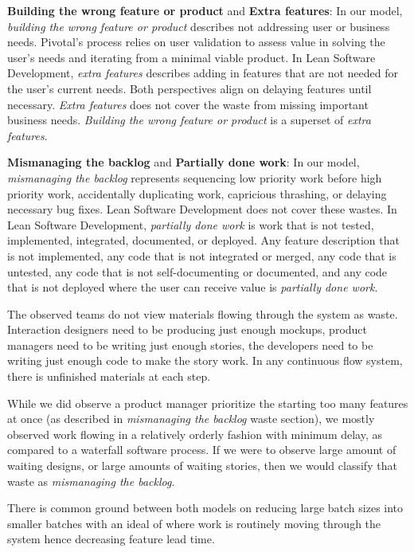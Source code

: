 \textbf{Building the wrong feature or product} and \textbf{Extra features}: In our model, \textit{building the wrong feature or product} describes not addressing user or business needs. Pivotal's process relies on user validation to assess value in solving the user's needs and iterating from a minimal viable product. In Lean Software Development, \textit{extra features} describes adding in features that are not needed for the user's current needs. Both perspectives align on delaying features until necessary. \textit{Extra features} does not cover the waste from missing important business needs. \textit{Building the wrong feature or product} is a superset of \textit{extra features}.

\textbf{Mismanaging the backlog} and \textbf{Partially done work}: In our model, \textit{mismanaging the backlog} represents sequencing low priority work before high priority work, accidentally duplicating work, capricious thrashing, or delaying necessary bug fixes. Lean Software Development does not cover these wastes. In Lean Software Development, \textit{partially done work} is work that is not tested, implemented, integrated, documented, or deployed. Any feature description that is not implemented, any code that is not integrated or merged, any code that is untested, any code that is not self-documenting or documented, and any code that is not deployed where the user can receive value is \textit{partially done work}.

The observed teams do not view materials flowing through the system as waste. Interaction designers need to be producing just enough mockups, product managers need to be writing just enough stories, the developers need to be writing just enough code to make the story work. In any continuous flow system, there is unfinished materials at each step. 

While we did observe a product manager prioritize the starting too many features at once (as described in \textit{mismanaging the backlog} waste section), we mostly observed work flowing in a relatively orderly fashion with minimum delay, as compared to a waterfall software process. If we were to observe large amount of waiting designs, or large amounts of waiting stories, then we would classify that waste as \textit{mismanaging the backlog}.

There is common ground between both models on reducing large batch sizes into smaller batches with an ideal of   where work is routinely moving through the system hence decreasing feature lead time. 

